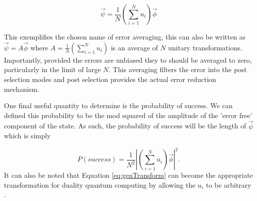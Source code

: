 \documentclass[aps,pra,twocolumn,superscriptaddress,numerical]{revtex4-1}
\begin{document}
\begin{equation}
	\vec{\psi}=\frac{1}{N}\left(\sum_{i=1}^{N}u_{i}\right)\vec{\phi}\label{eq:genTransform}
\end{equation}

This exemplifies the chosen name of error averaging, this can also be written as $\vec{\psi}=A\vec{\phi}$ where $A=\frac{1}{N}\left(\sum_{i=1}^{N}u_{i}\right)$ is an average of $N$ unitary transformations. Importantly, provided the errors are unbiased they to should be averaged to zero, particularly in the limit of large $N$. This averaging filters the error into the post selection modes and post selection provides the actual error reduction mechanism.

One final useful quantity to determine is the probability of success. We can defined this probability to be the mod squared of the amplitude of the 'error free' component of the state. As such, the probability of success will be the length of $\vec{\psi}$which is simply

\begin{equation}
	P\left(success\right)=\frac{1}{N^{2}}\left|\left(\sum_{i=1}^{N}u_{i}\right)\vec{\phi}\right|^{2}.
\end{equation}
It can also be noted that Equation \ref{eq:genTransform} can become the appropriate transformation for duality quantum computing by allowing the $u_{i}$ to be arbitrary \cite{dualityQC}.
\end{document}
